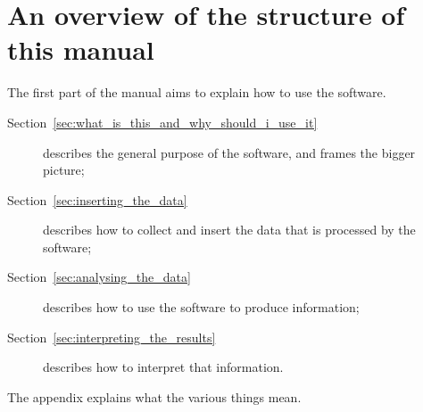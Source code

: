 \section{An overview of the structure of this manual}
\label{sec:an_overview_of_the_structure_of_this_manual}

The first part of the manual aims to explain how to use the software.

\begin{description}

\item[Section~\ref{sec:what_is_this_and_why_should_i_use_it}] describes the
	general purpose of the software, and frames the bigger picture;

\item[Section~\ref{sec:inserting_the_data}] describes how to collect and
	insert the data that is processed by the software;

\item[Section~\ref{sec:analysing_the_data}] describes how to use the
	software to produce information;

\item[Section~\ref{sec:interpreting_the_results}] describes how to interpret
	that information.

\end{description}


The appendix explains what the various things mean. %

